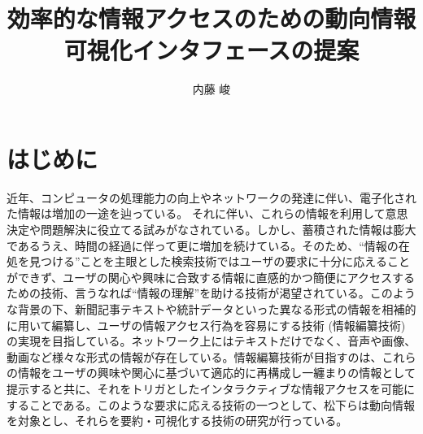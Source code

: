 \documentclass{matsushita-zemi}
\title{効率的な情報アクセスのための動向情報可視化インタフェースの提案}
\author{内藤 峻}
\begin{document}
\maketitle


\section{はじめに}
\label{background}

近年、コンピュータの処理能力の向上やネットワークの発達に伴い、電子化された情報は増加の一途を辿っている。
それに伴い、これらの情報を利用して意思決定や問題解決に役立てる試みがなされている。しかし、蓄積された情報は膨大であるうえ、時間の経過に伴って更に増加を続けている。そのため、“情報の在処を見つける”ことを主眼とした検索技術ではユーザの要求に十分に応えることができず、ユーザの関心や興味に合致する情報に直感的かつ簡便にアクセスするための技術、言うなれば“情報の理解”を助ける技術が渇望されている。このような背景の下、新聞記事テキストや統計データといった異なる形式の情報を相補的に用いて編纂し、ユーザの情報アクセス行為を容易にする技術 (情報編纂技術) の実現を目指している\cite{information_compilation}\cite{InformationcompiledStudyGroup}。ネットワーク上にはテキストだけでなく、音声や画像、動画など様々な形式の情報が存在している。情報編纂技術が目指すのは、これらの情報をユーザの興味や関心に基づいて適応的に再構成し一纏まりの情報として提示すると共に、それをトリガとしたインタラクティブな情報アクセスを可能にすることである。このような要求に応える技術の一つとして、松下らは動向情報を対象とし、それらを要約・可視化する技術の研究が行っている\cite{STEND}。
\end{document}

